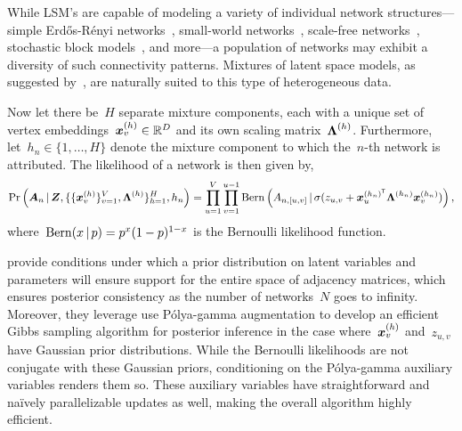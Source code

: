 While LSM's are capable of modeling a variety of individual network
structures---simple Erd\H{o}s-R\'{e}nyi
networks~\citep{erdos1959random}, small-world
networks~\citep{watts1998collective}, scale-free
networks~\citep{barabasi1999emergence}, stochastic block
models~\citep{nowicki2001estimation, airoldi2008mixed}, and more---a
population of networks may exhibit a diversity of such connectivity
patterns.  Mixtures of latent space models, as suggested
by~\citet{durante2016nonparametric}, are naturally suited to this type
of heterogeneous data.

Now let there
be~$H$ separate mixture components, each with 
a unique set of vertex embeddings~${\boldsymbol{x}_v^{(h)} \in \mathbb{R}^D}$
and its own scaling matrix~$\boldsymbol{\Lambda}^{(h)}$. Furthermore,
let~${h_n \in \{1, \ldots, H\}}$ denote the mixture component
to which the~$n$-th network is attributed. 
The likelihood of a network is then
given by,
\begin{align}
  \label{eq:molsm_lkhd}
  \Pr \left(\boldsymbol{A}_n \, | \,
    \boldsymbol{Z}, \{\{\boldsymbol{x}_v^{(h)}\}_{v=1}^V,
  \boldsymbol{\Lambda}^{(h)}\}_{h=1}^H, h_n \right) 
  = \prod_{u=1}^V \prod_{v=1}^{u-1}
  \mathrm{Bern} \left(A_{n,[u,v]} \, | \,
    \sigma(z_{u,v} + \boldsymbol{x}_{u}^{(h_n)^{\mathsf{T}}} \boldsymbol{\Lambda}^{(h_n)} \boldsymbol{x}_v^{(h_n)}) \right),
\end{align}
where~${\mathrm{Bern}(x \, | \, p) = p^x (1-p)^{1-x}}$ is the Bernoulli likelihood function.

\citet{durante2016nonparametric} provide conditions under which a prior
distribution on latent variables and parameters will ensure support for
the entire space of adjacency matrices, which ensures posterior consistency
as the number of networks~$N$ goes to infinity. Moreover, they leverage
use P\'{o}lya-gamma augmentation to develop an
efficient Gibbs sampling algorithm for posterior inference in the case
where~$\boldsymbol{x}_v^{(h)}$ and~$z_{u,v}$ have Gaussian prior distributions. 
While the Bernoulli likelihoods are not conjugate with these Gaussian
priors, conditioning on the P\'{o}lya-gamma auxiliary variables renders them so.
These auxiliary variables have straightforward and na\"{i}vely parallelizable
updates as well, making the overall algorithm highly efficient. 

